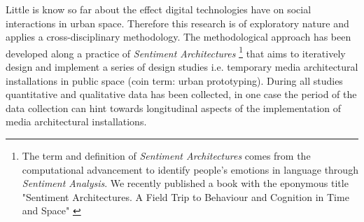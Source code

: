 Little is know so far about the effect digital technologies have on social interactions in urban space. Therefore this research is of exploratory nature and applies a cross-disciplinary methodology.  
The methodological approach has been developed along a practice of \textit{Sentiment Architectures} \footnote{The term and definition of \textit{Sentiment Architectures} comes from the computational advancement to identify people’s emotions in language through \textit{Sentiment Analysis}. We recently published a book with the eponymous title "Sentiment Architectures. A Field Trip to Behaviour and Cognition in Time and Space" \cite{Behrens_2016} } that aims to iteratively design and implement a series of design studies i.e. temporary media architectural installations in public space (coin term: urban prototyping). 
During all studies quantitative and qualitative data has been collected, in one case the period of the data collection can hint towards longitudinal aspects of the implementation of media architectural installations. 




